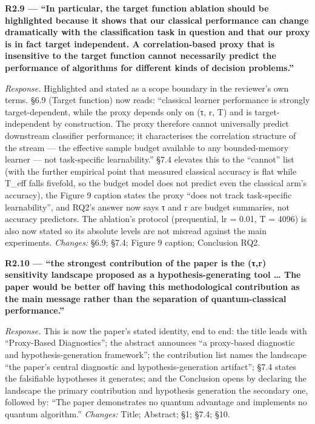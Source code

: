 \documentclass[
  11pt,
]{article}
\begin{document}
\textbf{R2.9 --- ``In particular, the target function ablation should be
highlighted because it shows that our classical performance can change
dramatically with the classification task in question and that our proxy
is in fact target independent. A correlation-based proxy that is
insensitive to the target function cannot necessarily predict the
performance of algorithms for different kinds of decision problems.''}

\emph{Response.} Highlighted and stated as a scope boundary in the
reviewer's own terms. §6.9 (Target function) now reads: ``classical
learner performance is strongly target-dependent, while the proxy
depends only on (τ, r, T) and is target-independent by construction. The
proxy therefore cannot universally predict downstream classifier
performance; it characterises the correlation structure of the stream
--- the effective sample budget available to any bounded-memory learner
--- not task-specific learnability.'' §7.4 elevates this to the
``cannot'' list (with the further empirical point that measured
classical accuracy is flat while T\_eff falls fivefold, so the budget
model does not predict even the classical arm's accuracy), the Figure 9
caption states the proxy ``does not track task-specific learnability'',
and RQ2's answer now says τ and r are budget summaries, not accuracy
predictors. The ablation's protocol (prequential, lr = 0.01, T = 4096)
is also now stated so its absolute levels are not misread against the
main experiments. \emph{Changes:} §6.9; §7.4; Figure 9 caption;
Conclusion RQ2.

\textbf{R2.10 --- ``the strongest contribution of the paper is the (τ,r)
sensitivity landscape proposed as a hypothesis-generating tool \ldots{}
The paper would be better off having this methodological contribution as
the main message rather than the separation of quantum-classical
performance.''}

\emph{Response.} This is now the paper's stated identity, end to end:
the title leads with ``Proxy-Based Diagnostics''; the abstract announces
``a proxy-based diagnostic and hypothesis-generation framework''; the
contribution list names the landscape ``the paper's central diagnostic
and hypothesis-generation artifact''; §7.4 states the falsifiable
hypotheses it generates; and the Conclusion opens by declaring the
landscape the primary contribution and hypothesis generation the
secondary one, followed by: ``The paper demonstrates no quantum
advantage and implements no quantum algorithm.'' \emph{Changes:} Title;
Abstract; §1; §7.4; §10.
\end{document}
